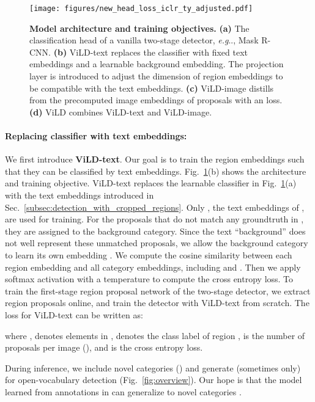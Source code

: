 \documentclass{article} \usepackage{iclr2022_conference,times}
\makeatletter
\DeclareRobustCommand\onedot{\futurelet\@let@token\@onedot}
\def\@onedot{\ifx\@let@token.\else.\null\fi\xspace}
\def\eg{\emph{e.g}\onedot} \def\Eg{\emph{E.g}\onedot}
\makeatother
\begin{document}
\begin{figure}[t]
\centering
  \texttt{[image: figures/new\_head\_loss\_iclr\_ty\_adjusted.pdf]}
  \vspace{-1ex}
   \caption{\textbf{Model architecture and training objectives.} \textbf{(a)} The classification head of a vanilla two-stage detector, \eg, Mask R-CNN. \textbf{(b)} ViLD-text replaces the classifier with fixed text embeddings and a learnable background embedding. The projection layer is introduced to adjust the dimension of region embeddings to be compatible with the text embeddings. \textbf{(c)} ViLD-image distills from the precomputed image embeddings of proposals with an  loss. \textbf{(d)} ViLD combines ViLD-text and ViLD-image.
   }
\label{fig:model_architecture}
\vspace{-2ex}
\end{figure}


\paragraph{Replacing classifier with text embeddings:}
We first introduce \textbf{ViLD-text}. Our goal is to train the region embeddings such that they can be classified by text embeddings. Fig.~\ref{fig:model_architecture}(b) shows the architecture and training objective. ViLD-text replaces the learnable classifier in Fig.~\ref{fig:model_architecture}(a) with the text embeddings introduced in Sec.~\ref{subsec:detection_with_cropped_regions}.
Only , the text embeddings of , are used for training. 
For the proposals that do not match any groundtruth in , they are assigned to the background category. Since the text ``background'' does not well represent these unmatched proposals, we allow the background category to learn its own embedding .
We compute the cosine similarity between each region embedding  and all category embeddings, including  and .
Then we apply softmax activation with a temperature  to compute the cross entropy loss. 
To train the first-stage region proposal network of the two-stage detector, we extract region proposals  online, and train the detector with ViLD-text from scratch.
The loss for ViLD-text can be written as:

where ,  denotes elements in ,
 denotes the class label of region ,  is the number of proposals per image (), and  is the cross entropy loss.

During inference, we include novel categories () and generate 
(sometimes  only) for open-vocabulary detection (Fig.~\ref{fig:overview}). Our hope is that the model learned from annotations in  can generalize to novel categories .
\end{document}
